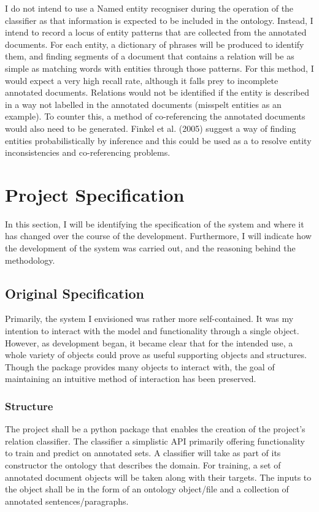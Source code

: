 \documentclass[11pt]{article} %
\begin{document}
I do not intend to use a Named entity recogniser during the operation of the classifier as that information is expected to be included in the ontology. Instead, I intend to record a locus of entity patterns that are collected from the annotated documents. For each entity, a dictionary of phrases will be produced to identify them, and finding segments of a document that contains a relation will be as simple as matching words with entities through those patterns. For this method, I would expect a very high recall rate, although it falls prey to incomplete annotated documents. Relations would not be identified if the entity is described in a way not labelled in the annotated documents (misspelt entities as an example). To counter this, a method of co-referencing the annotated documents would also need to be generated. Finkel et al. (2005) suggest a way of finding entities probabilistically by inference and this could be used as a to resolve entity inconsistencies and co-referencing problems.

\section{Project Specification}

In this section, I will be identifying the specification of the system and where it has changed over the course of the development. Furthermore, I will indicate how the development of the system was carried out, and the reasoning behind the methodology.

\subsection{Original Specification}

Primarily, the system I envisioned was rather more self-contained. It was my intention to interact with the model and functionality through a single object. However, as development began, it became clear that for the intended use, a whole variety of objects could prove as useful supporting objects and structures. Though the package provides many objects to interact with, the goal of maintaining an intuitive method of interaction has been preserved.

\subsubsection{Structure}

The project shall be a python package that enables the creation of the project’s relation classifier. The classifier a simplistic API primarily offering functionality to train and predict on annotated sets. A classifier will take as part of its constructor the ontology that describes the domain. For training, a set of annotated document objects will be taken along with their targets. The inputs to the object shall be in the form of an ontology object/file and a collection of annotated sentences/paragraphs.
\end{document}

